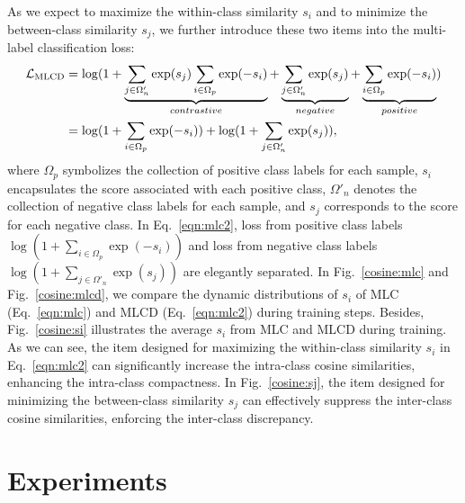 As we expect to maximize the within-class similarity $s_i$ and to minimize the between-class similarity $s_j$, we further introduce these two items into the multi-label classification loss:
\vspace{-2mm}
\begin{align}
\label{eqn:mlc2}
\mathcal{L}_\mathrm{MLCD}
& = \log(1+\underbrace{\sum_{j\in\Omega'_{n}}\exp({s_j})\sum_{i\in\Omega_{p}}\exp({-s_i})}_{contrastive}+\underbrace{\sum_{j\in\Omega'_{n}}\exp({s_j})}_{negative}+\underbrace{\sum_{i\in\Omega_{p}}\exp({-s_i})}_{positive}
) \notag \\ 
& = \log(1+\sum_{i \in \Omega_{p}}\exp({-s_i}))+ \log(1+\sum_{j \in \Omega'_{n}}\exp({s_j})), 
\end{align}
where $\Omega_p$ symbolizes the collection of positive class labels for each sample, $s_i$ encapsulates the score associated with each positive class, $\Omega'_n$ denotes the collection of negative class labels for each sample, and $s_j$ corresponds to the score for each negative class.
In Eq.~\ref{eqn:mlc2}, loss from positive class labels $\log(1+\sum_{i \in \Omega_{p}}\exp({-s_i}))$ and loss from negative class labels $\log(1+\sum_{j \in \Omega'_{n}}\exp({s_j}))$ are elegantly separated.
In Fig.~\ref{cosine:mlc} and Fig.~\ref{cosine:mlcd}, we compare the dynamic distributions of $s_i$ of MLC (Eq.~\ref{eqn:mlc}) and MLCD (Eq.~\ref{eqn:mlc2}) during training steps. Besides, Fig.~\ref{cosine:si} illustrates the average $s_i$ from MLC and MLCD during training. As we can see, the item designed for maximizing the within-class similarity $s_i$ in Eq.~\ref{eqn:mlc2} can significantly increase the intra-class cosine similarities, enhancing the intra-class compactness. In Fig.~\ref{cosine:sj}, the item designed for minimizing the between-class similarity $s_j$ can effectively suppress the inter-class cosine similarities, enforcing the inter-class discrepancy.

\section{Experiments}
